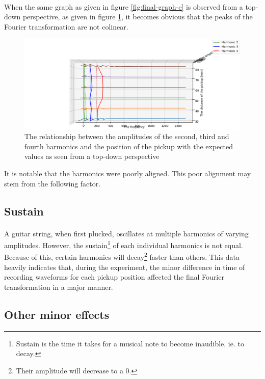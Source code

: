 \documentclass{article}
\begin{document}
\paragraph*{}
When the same graph as given in figure \ref{fig:final-graph-e} is observed 
from a top-down perspective, as given in figure \ref{fig:final-graph-e-t}, it 
becomes obvious that the peaks of the Fourier transformation are not colinear. 
\begin{figure}[ht]
	\centering
	\includegraphics[width=\textwidth]{img/final-graph-e-t}
	\caption{The relationship between the amplitudes of the second, third and 
	fourth harmonics and the position of the pickup with the expected values 
as seen from a top-down perspective}
	\label{fig:final-graph-e-t}
\end{figure}
It is notable that the harmonics were poorly aligned. This poor alignment may 
stem from the following factor.

\subsection{Sustain}

\paragraph*{}
A guitar string, when first plucked, oscillates at multiple harmonics of
varying amplitudes. However, the sustain\footnote{Sustain is the time it takes
for a musical note to become inaudible, ie. to decay.} of each individual
harmonics is not equal. Because of this, certain harmonics will
decay\footnote{Their amplitude will decrease to a 0.} faster than others. This
data heavily indicates that, during the experiment, the minor difference in
time of recording waveforms for each pickup position affected the final Fourier
transformation in a major manner.

\subsection{Other minor effects}
\end{document}
